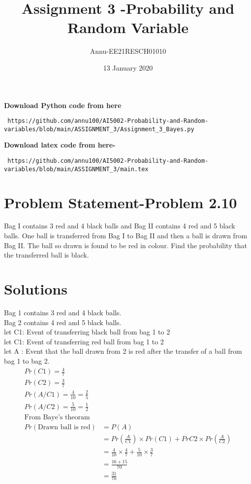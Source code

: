 \documentclass[journel,12pt,twocoloums]{IEEEtran}
\title{Assignment 3 -Probability and Random Variable}
\author{Annu-EE21RESCH01010}
\date{13 January 2020}
\begin{document}
 \maketitle
 \textbf{Download Python code from here}\\
\begin{lstlisting}
 https://github.com/annu100/AI5002-Probability-and-Random-variables/blob/main/ASSIGNMENT_3/Assignment_3_Bayes.py
 \end{lstlisting}
\textbf{Download latex code from here-}\\
\begin{lstlisting}
 https://github.com/annu100/AI5002-Probability-and-Random-variables/blob/main/ASSIGNMENT_3/main.tex
 \end{lstlisting}
 \section{Problem Statement-Problem 2.10}
Bag I contains 3 red and 4 black balls and
Bag II contains 4 red and 5 black balls. One
ball is transferred from Bag I to Bag II and
then a ball is drawn from Bag II. The ball
so drawn is found to be red in colour. Find
the probability that the transferred ball is black.
\section{Solutions}
Bag 1 contains 3 red and 4 black balls.\\
Bag 2 contains 4 red and 5 black balls.\\

let  C1: Event of transferring black ball from bag 1 to 2\\
let  C1: Event of transferring red ball from bag 1 to 2\\
let A : Event that the ball drawn from 2 is red after the transfer of a ball from bag 1 to bag 2.\\
\begin{align*}
Pr(C1)= \frac{4}{7}\\
Pr(C2)=\frac{3}{7}\\
Pr(A/C1)=\frac{4}{10}=\frac{2}{5}\\
Pr(A/C2)=\frac{5}{10}=\frac{1}{2}\\
\text{From Baye's theoram} \\
Pr(\text{Drawn ball is red})&=P(A)\\
                     &=Pr(\frac{A}{C1})\times   Pr(C1)+Pr{C2}\times Pr(\frac{A}{C2})\\
                     &=\frac{4}{10}\times \frac{4}{7}+\frac{5}{10}\times \frac{3}{7}\\
                     &=\frac{16+15}{70}\\
                     &=\frac{31}{70}
\end{align*}
\end{document}
